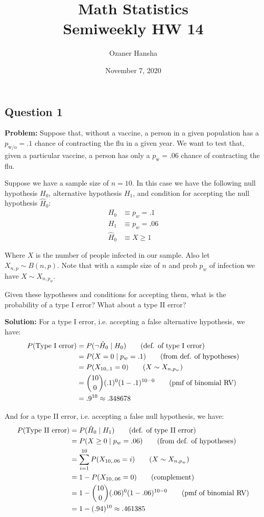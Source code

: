 \documentclass{article}
\begin{document}
\title{Math Statistics\\ Semiweekly HW 14}
\author{Ozaner Hansha}
\date{November 7, 2020}
\maketitle

\subsection*{Question 1}
\noindent\textbf{Problem:} Suppose that, without a vaccine, a person in a given population has a $p_{\text{w/o}}=.1$ chance of contracting the flu in a given year. We want to test that, given a particular vaccine, a person has only a $p_{\text{w}}=.06$ chance of contracting the flu.

Suppose we have a sample size of $n=10$. In this case we have the following null hypothesis $H_0$, alternative hypothesis $H_1$, and condition for accepting the null hypothesis $\hat H_0$:
\begin{align*}
    H_0&\equiv p_w=.1\tag{prob. of infection w/ vaccine is unchanged}\\
    H_1&\equiv p_w=.06\tag{prob. of infection w/ vaccine is $.06$}\\
    \hat H_0&\equiv X\ge1\tag{At least 1 subject infected within a year}
\end{align*}

Where $X$ is the number of people infected in our sample. Also let $X_{n,p}\sim B(n,p)$. Note that with a sample size of $n$ and prob $p_w$ of infection we have $X\sim X_{n,p_w}$.
\bigskip

Given these hypotheses and conditions for accepting them, what is the probability of a type I error? What about a type II error?
\bigskip

\noindent\textbf{Solution:} For a type I error, i.e. accepting a false alternative hypothesis, we have:
\begin{align*}
    P(\text{Type I error})&=P(\neg\hat H_0\mid H_0)\tag{def. of type I error}\\
    &=P(X=0\mid p_w=.1)\tag{from def. of hypotheses}\\
    &=P(X_{10,.1}=0)\tag{$X\sim X_{n,p_w}$}\\
    &=\binom{10}{0}(.1)^0(1-.1)^{10-0}\tag{pmf of binomial RV}\\
    &=.9^{10}\approx.348678
\end{align*}

And for a type II error, i.e. accepting a false null hypothesis, we have:
\begin{align*}
    P(\text{Type II error})&=P(\hat H_0\mid H_1)\tag{def. of type II error}\\
    &=P(X\ge0\mid p_w=.06)\tag{from def. of hypotheses}\\
    &=\sum_{i=1}^{10}P(X_{10,.06}=i)\tag{$X\sim X_{n,p_w}$}\\
    &=1-P(X_{10,.06}=0)\tag{complement}\\
    &=1-\binom{10}{0}(.06)^0(1-.06)^{10-0}\tag{pmf of binomial RV}\\
    &=1-(.94)^{10}\approx.461385
\end{align*}
\end{document}
